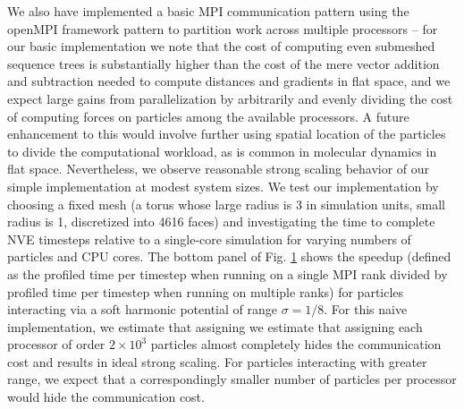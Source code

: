 \documentclass[preprint,12pt]{elsarticle}
\begin{document}
\begin{figure}[th!]
    \label{fig:computationalComplexityFixedMesh}
\end{figure}

We also have implemented a basic MPI communication pattern using the openMPI framework \cite{gabriel2004open} pattern to partition work across multiple processors -- for our basic implementation we note that the cost of computing even submeshed sequence trees is substantially higher than the cost of the mere vector addition and subtraction needed to compute distances and gradients in flat space, and we expect large gains from parallelization by arbitrarily and evenly dividing the cost of computing forces on particles among the available processors. A future enhancement to this would involve further using spatial location of the particles to divide the computational workload, as is common in  molecular dynamics in flat space. Nevertheless, we observe reasonable strong scaling behavior of our simple implementation at modest system sizes. We test our implementation by choosing a fixed mesh (a torus whose large radius is 3 in simulation units, small radius is 1, discretized into 4616 faces) and investigating the time to complete NVE timesteps relative to a single-core simulation for varying numbers of particles and CPU cores. The bottom panel of Fig. \ref{fig:computationalComplexityFixedMesh} shows the speedup (defined as the profiled time per timestep when running on a single MPI rank divided by profiled time per timestep when running on multiple ranks) for particles interacting via a soft harmonic potential of range $\sigma=1/8$. For this naive implementation, we estimate that assigning we estimate that assigning each processor of order $2\times 10^3$ particles almost completely hides the communication cost and results in ideal strong scaling. For particles interacting with greater range, we expect that a correspondingly smaller number of particles per processor would hide the communication cost.
\end{document}
